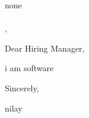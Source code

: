 \documentclass[11pt,a4paper]{letter}
\begin{document}
\begin{letter}{none\\
\\
, }

\address{nilay\\
\\
, \\
9016989674\\
\href{mailto:nilaypatel@gmail.com}{nilaypatel@gmail.com}}

\date{April 14, 2025}

\opening{Dear Hiring Manager,}

i am software



\closing{Sincerely,}

\vspace{0.5in}
nilay

\end{letter}
\end{document}
